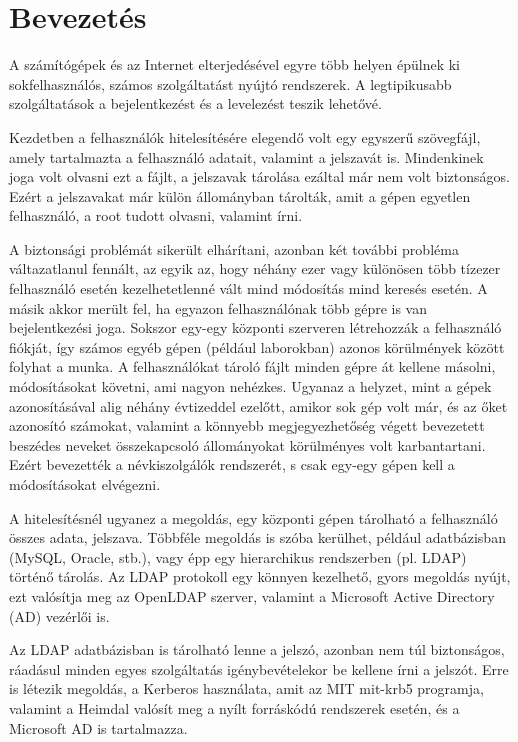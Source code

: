 \chapter*{Bevezetés}
A számítógépek és az Internet elterjedésével egyre több helyen épülnek ki sokfelhasználós, számos szolgáltatást nyújtó
rendszerek. A legtipikusabb szolgáltatások a bejelentkezést és a levelezést teszik lehetővé.

Kezdetben a felhasználók hitelesítésére elegendő volt egy egyszerű szövegfájl, amely tartalmazta a felhasználó
adatait, valamint a jelszavát is. Mindenkinek joga volt olvasni ezt a fájlt, a jelszavak tárolása ezáltal már nem volt
biztonságos. Ezért a jelszavakat már külön állományban tárolták, amit a gépen egyetlen felhasználó, a root tudott
olvasni, valamint írni.

A biztonsági problémát sikerült elhárítani, azonban két további probléma váltazatlanul fennált, az egyik az, hogy
néhány ezer vagy különösen több tízezer felhasználó esetén kezelhetetlenné vált mind módosítás mind keresés esetén. A
másik akkor merült fel, ha egyazon felhasználónak több gépre is van bejelentkezési joga. Sokszor egy-egy központi
szerveren létrehozzák a felhasználó fiókját, így számos egyéb gépen (például laborokban) azonos körülmények között
folyhat a munka. A felhasználókat tároló fájlt minden gépre át kellene másolni, módosításokat követni, ami nagyon
nehézkes. Ugyanaz a helyzet, mint a gépek azonosításával alig néhány évtizeddel ezelőtt, amikor sok gép volt már, és
az őket azonosító számokat, valamint a könnyebb megjegyezhetőség végett bevezetett beszédes neveket összekapcsoló
állományokat körülményes volt karbantartani. Ezért bevezették a névkiszolgálók rendszerét, s csak egy-egy gépen kell a
módosításokat elvégezni.

A hitelesítésnél ugyanez a megoldás, egy központi gépen tárolható a felhasználó összes adata, jelszava. Többféle
megoldás is szóba kerülhet, például adatbázisban (MySQL, Oracle, stb.), vagy épp egy hierarchikus
rendszerben  (pl. LDAP) történő tárolás. Az LDAP protokoll egy könnyen kezelhető, gyors megoldás nyújt, ezt valósítja
meg az OpenLDAP szerver, valamint a Microsoft Active Directory (AD) vezérlői is. 

Az LDAP adatbázisban is tárolható lenne a jelszó, azonban nem túl biztonságos, ráadásul minden egyes szolgáltatás
igénybevételekor be kellene írni a jelszót. Erre is létezik megoldás, a Kerberos használata, amit az MIT mit-krb5
programja, valamint a Heimdal valósít meg a nyílt forráskódú rendszerek esetén, és a Microsoft AD is tartalmazza.

